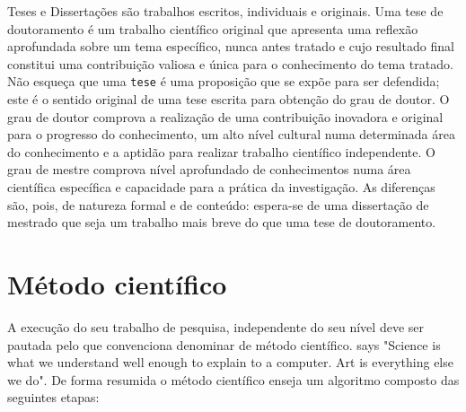 Teses e Dissertações são trabalhos escritos, individuais e
originais. Uma tese de doutoramento é um trabalho científico original
que apresenta uma reflexão aprofundada sobre um tema específico,
nunca antes tratado e cujo resultado final constitui uma contribuição
valiosa e única para o conhecimento do tema tratado. Não esqueça
que uma \texttt{tese} é uma proposição que se expõe para ser
defendida; este é o sentido original de uma tese escrita para
obtenção do grau de doutor. O grau de doutor comprova a
realização de uma contribuição inovadora e original para o
progresso do conhecimento, um alto nível cultural numa determinada
área do conhecimento e a aptidão para realizar trabalho
científico independente. O grau de mestre comprova nível aprofundado
de conhecimentos numa área científica específica e capacidade
para a prática da investigação. As diferenças são, pois,
de natureza formal e de conteúdo: espera-se de uma dissertação de
mestrado que seja um trabalho mais breve do que uma tese de doutoramento.

\section{Método científico}
A execução do seu trabalho de pesquisa, independente do seu nível deve ser pautada pelo que convenciona denominar de método científico. 
\citeauthor{knuth:tex} says "Science is what we understand well enough to explain to a computer. Art is everything else we do". De forma resumida o método científico enseja um algoritmo composto das seguintes etapas:

